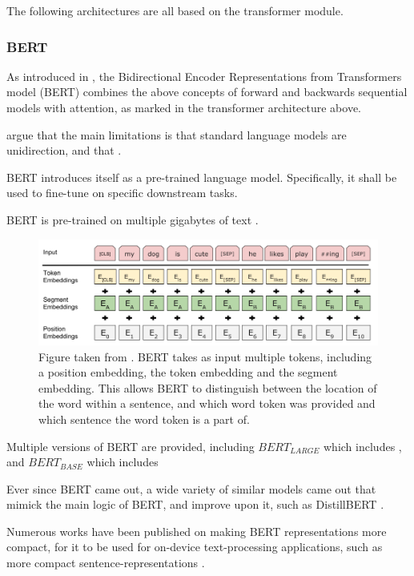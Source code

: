 \documentclass[a4paper,12pt,twoside,openright]{report}
\begin{document}
The following architectures are all based on the transformer module.

\subsubsection{BERT}

As introduced in \cite{devlin18}, the Bidirectional Encoder Representations from Transformers model (BERT) combines the above concepts of forward and backwards sequential models with attention, as marked in the transformer architecture above.

\cite{devlin18} argue that the main limitations is that standard language models are unidirection, and that .

BERT introduces itself as a pre-trained language model.
Specifically, it shall be used to fine-tune on specific downstream tasks.

BERT is pre-trained on %
multiple gigabytes of text .



\begin{figure}[h]
	\center
  \includegraphics[width=0.6\linewidth]{./assets/background/BERT_multiple_input_tokens.png}
  \caption{Figure taken from \cite{devlin18}. BERT takes as input multiple tokens, including a position embedding, the token embedding and the segment embedding. This allows BERT to distinguish between the location of the word within a sentence, and which word token was provided and which sentence the word token is a part of.}
  \label{fig:cbow_skipgram}
\end{figure}


Multiple versions of BERT are provided, including $BERT_{LARGE}$ which includes %
, and $BERT_{BASE}$ which includes %

Ever since BERT came out, a wide variety of similar models came out that mimick the main logic of BERT, and improve upon it, such as DistillBERT \cite{sanh19}.

Numerous works have been published on making BERT representations more compact, for it to be used for on-device text-processing applications, such as more compact sentence-representations \cite{shen19}.
\end{document}
